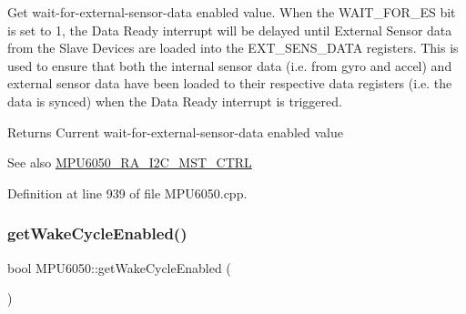 Get wait-\/for-\/external-\/sensor-\/data enabled value. When the W\+A\+I\+T\+\_\+\+F\+O\+R\+\_\+\+ES bit is set to 1, the Data Ready interrupt will be delayed until External Sensor data from the Slave Devices are loaded into the E\+X\+T\+\_\+\+S\+E\+N\+S\+\_\+\+D\+A\+TA registers. This is used to ensure that both the internal sensor data (i.\+e. from gyro and accel) and external sensor data have been loaded to their respective data registers (i.\+e. the data is synced) when the Data Ready interrupt is triggered.

\begin{DoxyReturn}{Returns}
Current wait-\/for-\/external-\/sensor-\/data enabled value 
\end{DoxyReturn}
\begin{DoxySeeAlso}{See also}
\mbox{\hyperlink{MPU6050_8h_ae4804708dd5f21dbca1ff1815b883504}{M\+P\+U6050\+\_\+\+R\+A\+\_\+\+I2\+C\+\_\+\+M\+S\+T\+\_\+\+C\+T\+RL}} 
\end{DoxySeeAlso}


Definition at line 939 of file M\+P\+U6050.\+cpp.


\begin{DoxyCode}{0}

\end{DoxyCode}
\mbox{\label{classMPU6050_a89afc5235b9088c696e2cc7841f5259a}} 
\subsubsection{\texorpdfstring{getWakeCycleEnabled()}{getWakeCycleEnabled()}}
{\footnotesize\ttfamily bool M\+P\+U6050\+::get\+Wake\+Cycle\+Enabled (\begin{DoxyParamCaption}{ }\end{DoxyParamCaption})}

